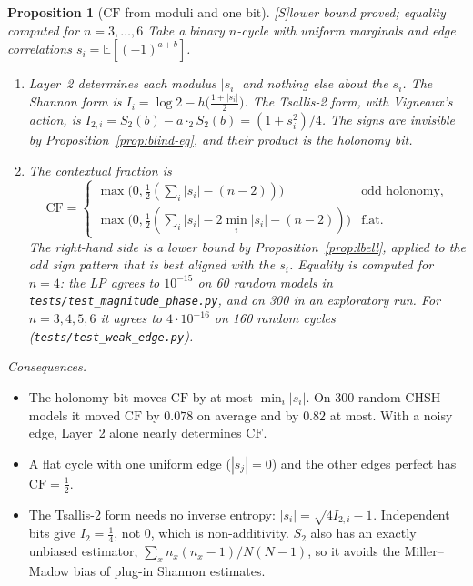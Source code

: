 \documentclass[11pt]{article}
\newtheorem{proposition}[theorem]{Proposition}
\theoremstyle{definition}
\theoremstyle{remark}
\newcommand{\CF}{\mathrm{CF}}
\newcommand{\src}[1]{\textsf{\small[#1]}}
\newcommand{\st}[1]{\textsf{\small\color{gray}#1}}
\begin{document}
\begin{proposition}[$\CF$ from moduli and one bit]\label{prop:modphase}\src{S}\st{lower bound proved; equality computed for $n=3,\dots,6$}
Take a binary $n$-cycle with uniform marginals and edge correlations $s_i=\mathbb E[(-1)^{a+b}]$.
\begin{enumerate}
  \item Layer~2 determines each modulus $|s_i|$ and nothing else about the $s_i$. The Shannon form is $I_i=\log2-h\bigl(\tfrac{1+|s_i|}2\bigr)$. The Tsallis-2 form, with Vigneaux's action, is $I_{2,i}=S_2(b)-a\cdot_2S_2(b)=(1+s_i^2)/4$. The signs are invisible by Proposition~\ref{prop:blind-eg}, and their product is the holonomy bit.
  \item The contextual fraction is
  \[
  \CF=\begin{cases}\max\bigl(0,\tfrac12(\sum_i|s_i|-(n-2))\bigr) & \text{odd holonomy,}\\[2pt]
  \max\bigl(0,\tfrac12(\sum_i|s_i|-2\min_i|s_i|-(n-2))\bigr) & \text{flat.}\end{cases}
  \]
  The right-hand side is a lower bound by Proposition~\ref{prop:lbell}, applied to the odd sign pattern that is best aligned with the $s_i$. Equality is computed for $n=4$: the LP agrees to $10^{-15}$ on 60 random models in \texttt{tests/test\_magnitude\_phase.py}, and on 300 in an exploratory run. For $n=3,4,5,6$ it agrees to $4\cdot10^{-16}$ on 160 random cycles (\texttt{tests/test\_weak\_edge.py}).
\end{enumerate}
\end{proposition}
\noindent\emph{Consequences.}
\begin{itemize}
  \item The holonomy bit moves $\CF$ by at most $\min_i|s_i|$. On 300 random CHSH models it moved $\CF$ by $0.078$ on average and by $0.82$ at most. With a noisy edge, Layer~2 alone nearly determines $\CF$.
  \item A flat cycle with one uniform edge ($|s_j|=0$) and the other edges perfect has $\CF=\tfrac12$.
  \item The Tsallis-2 form needs no inverse entropy: $|s_i|=\sqrt{4I_{2,i}-1}$. Independent bits give $I_2=\tfrac14$, not $0$, which is non-additivity. $S_2$ also has an exactly unbiased estimator, $\sum_xn_x(n_x-1)/N(N-1)$, so it avoids the Miller--Madow bias of plug-in Shannon estimates.
\end{itemize}
\end{document}
